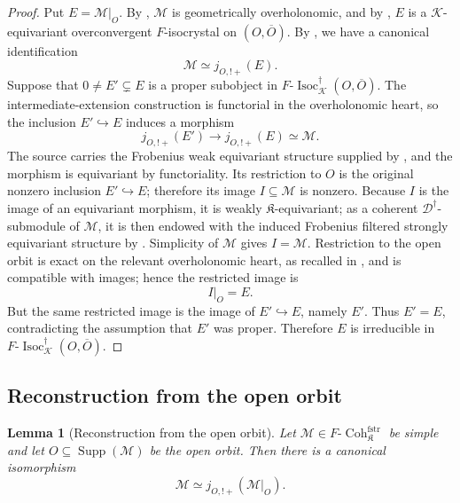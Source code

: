 \documentclass[11pt]{amsart}
\theoremstyle{plain}
\newtheorem{lemma}{Lemma}[section]
\theoremstyle{definition}
\theoremstyle{remark}
\newcommand{\Coh}{\operatorname{Coh}}
\newcommand{\Isoc}{\operatorname{Isoc}}
\newcommand{\Supp}{\operatorname{Supp}}
\newcommand{\fstr}{\mathrm{fstr}}
\begin{document}
\begin{proof}
Put \(E=\mathcal M|_O\).  By ,
\(\mathcal M\) is geometrically overholonomic, and by
, \(E\) is a \(\mathcal K\)-equivariant
overconvergent \(F\)-isocrystal on \((O,\overline O)\).  By
, we have a canonical identification
\[
  \mathcal M\simeq j_{O,!+}(E).
\]
Suppose that
\(0\neq E'\subsetneq E\) is a proper subobject in
\(F\text{-}\Isoc^{\dagger}_{\mathcal K}(O,\overline O)\).  The intermediate-extension
construction is functorial in the overholonomic heart, so the inclusion
\(E'\hookrightarrow E\) induces a morphism
\[
  j_{O,!+}(E')\longrightarrow j_{O,!+}(E)\simeq\mathcal M.
\]
The source carries the Frobenius weak equivariant structure supplied by
, and the morphism is equivariant by
functoriality.  Its restriction to \(O\) is the original nonzero inclusion
\(E'\hookrightarrow E\); therefore its image \(I\subseteq\mathcal M\) is nonzero.
Because \(I\) is the image of an equivariant morphism, it is weakly
\(\mathfrak K\)-equivariant; as a coherent \(\mathscr D^\dagger\)-submodule of
\(\mathcal M\), it is then endowed with the induced Frobenius filtered strongly
equivariant structure by .  Simplicity of
\(\mathcal M\) gives \(I=\mathcal M\).  Restriction to the open orbit is exact
on the relevant overholonomic heart, as recalled in , and
is compatible with images; hence the restricted image is
\[
  I|_O=E.
\]
But the same restricted image is the image of \(E'\hookrightarrow E\), namely
\(E'\).  Thus \(E'=E\), contradicting the assumption that \(E'\) was proper.
Therefore \(E\) is irreducible in
\(F\text{-}\Isoc^{\dagger}_{\mathcal K}(O,\overline O)\).
\end{proof}

\subsection{Reconstruction from the open orbit}

\begin{lemma}[Reconstruction from the open orbit]
\label{lem:reconstruction}
Let \(\mathcal M\in F\text{-}\Coh^{\fstr}_{\mathfrak K}\) be simple and let \(O\subseteq\Supp(\mathcal M)\) be the open
orbit. Then there is a canonical isomorphism
\[
  \mathcal M\simeq j_{O,!+}(\mathcal M|_O).
\]
\end{lemma}
\end{document}

